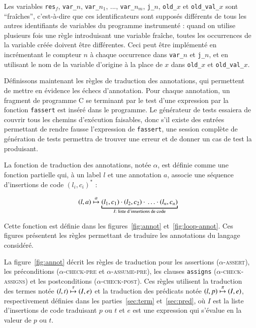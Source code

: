 Les variables \lstinline'res'$_f$, \lstinline'var_'$n$, \lstinline'var_'$n_1$,
..., \lstinline'var_'$n_m$,
\lstinline'j_'$n$, \lstinline'old_'$x$ et \lstinline'old_val_'$x$ sont
``fraîches'', c'est-à-dire que ces identificateurs sont supposés
différents de tous les autres identifiants de variables du programme instrumenté
: quand on utilise plusieurs fois une règle introduisant une variable fraîche,
toutes les occurrences de la variable créée doivent être différentes.
Ceci peut être implémenté en incrémentant le compteur $n$ à chaque
occurrence dans \lstinline'var_'$n$ et \lstinline'j_'$n$, et en utilisant le nom
de la variable d'origine à la place de $x$ dans \lstinline'old_'$x$ et
\lstinline'old_val_'$x$.

Définissons maintenant les règles de traduction des
annotations, qui permettent de mettre en évidence les échecs d'annotation.
Pour chaque annotation, un fragment de programme C se terminant par le test
d'une expression par la fonction \lstinline'fassert' est inséré dans le
programme.
Le générateur de tests essaiera de couvrir tous les chemins d'exécution
faisables, donc s'il existe des entrées permettant de rendre fausse
l'expression de \lstinline'fassert', une session complète de génération de tests
permettra de trouver une erreur et de donner un cas de test la produisant.

La fonction de traduction des annotations, notée $\alpha$, est définie comme une
fonction partielle qui, à un label $l$ et une annotation $a$,
associe une séquence d'insertions de code $(l_i, c_i)^*$ :

\[
(l, a) \arule
\underbracket{(l_1, c_1) \concat (l_2, c_2) \concat \ldots
  \concat (l_n, c_n)}_{I : \text{ liste d'insertions de code}}
\]

Cette fonction est définie dans les figures~\ref{fig:annot}
et~\ref{fig:loop-annot}.
Ces figures présentent les règles permettant de traduire les annotations du
langage \eacsl considéré.



La figure~\ref{fig:annot} décrit les règles de traduction pour les assertions
(\textsc{$\alpha$-assert}), les préconditions (\textsc{$\alpha$-check-pre} et
\textsc{$\alpha$-assume-pre}), les clauses \lstinline'assigns'
(\textsc{$\alpha$-check-assigns}) et les postconditions
(\textsc{$\alpha$-check-post}).
Ces règles utilisent la traduction des termes notée $(l, t) \overset{\tau}{\mapsto} (I, e)$ et
la traduction des prédicats notée $(l, p) \overset{\pi}{\mapsto} (I, e)$, respectivement
définies dans les parties~\ref{sec:term} et~\ref{sec:pred}, où $I$ est la liste
d'insertions de code traduisant $p$ ou $t$ et $e$ est une expression qui
s'évalue en la valeur de $p$ ou $t$.

